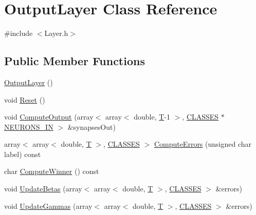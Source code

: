 \hypertarget{class_output_layer}{}\section{Output\+Layer Class Reference}
\label{class_output_layer}


{\ttfamily \#include $<$Layer.\+h$>$}

\subsection*{Public Member Functions}
\begin{DoxyCompactItemize}
\item 
\mbox{\hyperlink{class_output_layer_a65757bdb7320aa070ba901ea36a46663}{Output\+Layer}} ()
\item 
void \mbox{\hyperlink{class_output_layer_aba802a4e6d257f69d4cb2951e74bbeca}{Reset}} ()
\item 
void \mbox{\hyperlink{class_output_layer_a0e8f2b5607f33c67125b7124cd57a6a6}{Compute\+Output}} (array$<$ array$<$ double, \mbox{\hyperlink{_constants_8h_a6108cec236ef7a2e1d3259931de87186}{T}}-\/1 $>$, \mbox{\hyperlink{_constants_8h_a12148c0e36153a905f4f6ef1afdbb27e}{C\+L\+A\+S\+S\+ES}} $\ast$\mbox{\hyperlink{_constants_8h_aefc2426e4681da445c7793c98a83c532}{N\+E\+U\+R\+O\+N\+S\+\_\+\+IN}} $>$ \&synapses\+Out)
\item 
array$<$ array$<$ double, \mbox{\hyperlink{_constants_8h_a6108cec236ef7a2e1d3259931de87186}{T}} $>$, \mbox{\hyperlink{_constants_8h_a12148c0e36153a905f4f6ef1afdbb27e}{C\+L\+A\+S\+S\+ES}} $>$ \mbox{\hyperlink{class_output_layer_ab3a0791041b3e677d80d353c6109a7c6}{Compute\+Errors}} (unsigned char label) const
\item 
char \mbox{\hyperlink{class_output_layer_a0e64179945329c2a65fbc42f68f9945a}{Compute\+Winner}} () const
\item 
void \mbox{\hyperlink{class_output_layer_a48c40aafb9681f4a3464aa4a5a5fa83d}{Update\+Betas}} (array$<$ array$<$ double, \mbox{\hyperlink{_constants_8h_a6108cec236ef7a2e1d3259931de87186}{T}} $>$, \mbox{\hyperlink{_constants_8h_a12148c0e36153a905f4f6ef1afdbb27e}{C\+L\+A\+S\+S\+ES}} $>$ \&errors)
\item 
void \mbox{\hyperlink{class_output_layer_a622d1f007ffa90246d823b8a74bc2db1}{Update\+Gammas}} (array$<$ array$<$ double, \mbox{\hyperlink{_constants_8h_a6108cec236ef7a2e1d3259931de87186}{T}} $>$, \mbox{\hyperlink{_constants_8h_a12148c0e36153a905f4f6ef1afdbb27e}{C\+L\+A\+S\+S\+ES}} $>$ \&errors)
\end{DoxyCompactItemize}
